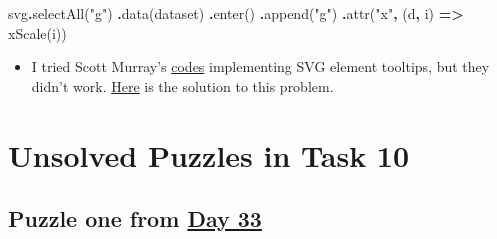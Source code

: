 \documentclass[
]{book}
\newenvironment{Shaded}{\begin{snugshade}}{\end{snugshade}}
\newcommand{\FunctionTok}[1]{\textcolor[rgb]{0.00,0.00,0.00}{#1}}
\newcommand{\KeywordTok}[1]{\textcolor[rgb]{0.13,0.29,0.53}{\textbf{#1}}}
\newcommand{\NormalTok}[1]{#1}
\newcommand{\OperatorTok}[1]{\textcolor[rgb]{0.81,0.36,0.00}{\textbf{#1}}}
\newcommand{\StringTok}[1]{\textcolor[rgb]{0.31,0.60,0.02}{#1}}
\providecommand{\tightlist}{%
  \setlength{\itemsep}{0pt}\setlength{\parskip}{0pt}}
\begin{document}
\begin{Shaded}
\begin{Highlighting}[]
\NormalTok{svg}\OperatorTok{.}\FunctionTok{selectAll}\NormalTok{(}\StringTok{"g"}\NormalTok{)}
   \OperatorTok{.}\FunctionTok{data}\NormalTok{(dataset)}
   \OperatorTok{.}\FunctionTok{enter}\NormalTok{()}
   \OperatorTok{.}\FunctionTok{append}\NormalTok{(}\StringTok{"g"}\NormalTok{)}
   \OperatorTok{.}\FunctionTok{attr}\NormalTok{(}\StringTok{"x"}\OperatorTok{,}\NormalTok{ (d}\OperatorTok{,}\NormalTok{ i) }\KeywordTok{=\textgreater{}} \FunctionTok{xScale}\NormalTok{(i))}
\end{Highlighting}
\end{Shaded}

\begin{itemize}
\tightlist
\item
  I tried Scott Murray's \href{https://github.com/scotthmurray/d3-book/blob/master/chapter_10/13_svg_tooltip.html}{codes} implementing SVG element tooltips, but they didn't work. \href{https://github.com/scotthmurray/d3-book/issues/47}{Here} is the solution to this problem.
\end{itemize}

\hypertarget{unsolved-puzzles-in-task-10}{%
\section{Unsolved Puzzles in Task 10}\label{unsolved-puzzles-in-task-10}}

\hypertarget{puzzle-one-from-day-33}{%
\subsection{\texorpdfstring{Puzzle one from \href{https://observablehq.com/@hongtaoh/day-33-2020-09-26}{Day 33}}{Puzzle one from Day 33}}\label{puzzle-one-from-day-33}}
\end{document}
